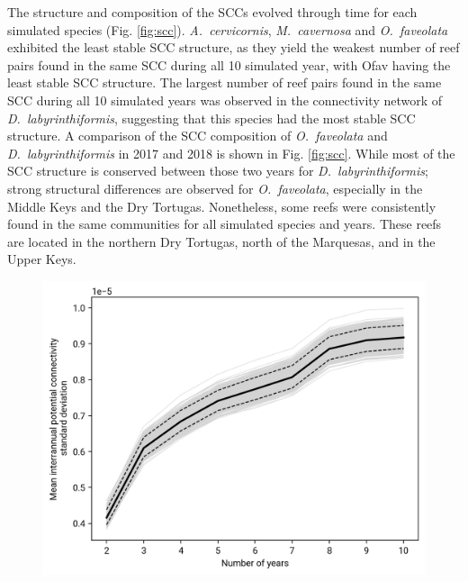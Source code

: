 \documentclass[preprint,12pt,authoryear]{elsarticle}
\begin{document}
The structure and composition of the SCCs evolved through time for each simulated species (Fig. \ref{fig:scc}). \textit{A.~cervicornis}, \textit{M.~cavernosa} and \textit{O.~faveolata} exhibited the least stable SCC structure, as they yield the weakest number of reef pairs found in the same SCC during all 10 simulated year, with Ofav having the least stable SCC structure. The largest number of reef pairs found in the same SCC during all 10 simulated years was observed in the connectivity network of \textit{D.~labyrinthiformis}, suggesting that this species had the most stable SCC structure. A comparison of the SCC composition of \textit{O.~faveolata} and \textit{D.~labyrinthiformis} in 2017 and 2018 is shown in Fig. \ref{fig:scc}. While most of the SCC structure is conserved between those two years for \textit{D.~labyrinthiformis}; strong structural differences are observed for \textit{O.~faveolata}, especially in the Middle Keys and the Dry Tortugas. Nonetheless, some reefs were consistently found in the same communities for all simulated species and years. These reefs are located in the northern Dry Tortugas, north of the Marquesas, and in the Upper Keys.

\begin{figure}
    \centering
    \includegraphics[width=\textwidth]{figures/fig_cm_std.png}
    \caption{}\label{fig:saturation}
\end{figure}
\end{document}

